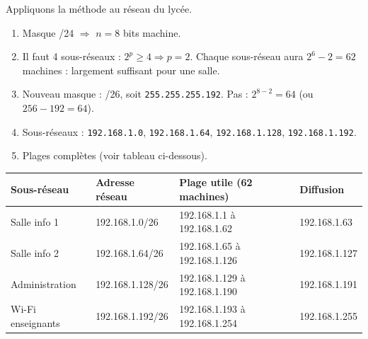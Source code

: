 \documentclass[11pt]{article}
\begin{document}
\begin{exemplebox}
Appliquons la méthode au réseau du lycée.
\begin{enumerate}
\item Masque /24 $\Rightarrow$ $n = 8$ bits machine.
\item Il faut 4 sous-réseaux : $2^p \geq 4 \Rightarrow p = 2$. Chaque sous-réseau aura $2^6 - 2 = 62$ machines : largement suffisant pour une salle.
\item Nouveau masque : /26, soit \texttt{255.255.255.192}. Pas : $2^{8-2} = 64$ (ou $256 - 192 = 64$).
\item Sous-réseaux : \texttt{192.168.1.0}, \texttt{192.168.1.64}, \texttt{192.168.1.128}, \texttt{192.168.1.192}.
\item Plages complètes (voir tableau ci-dessous).
\end{enumerate}
\begin{center}
\begin{tabularx}{\linewidth}{|l|l|X|l|}
\hline
\rowcolor{popblueL} \textbf{Sous-réseau} & \textbf{Adresse réseau} & \textbf{Plage utile (62 machines)} & \textbf{Diffusion} \\
\hline
Salle info 1 & 192.168.1.0/26 & 192.168.1.1 à 192.168.1.62 & 192.168.1.63 \\
\hline
Salle info 2 & 192.168.1.64/26 & 192.168.1.65 à 192.168.1.126 & 192.168.1.127 \\
\hline
Administration & 192.168.1.128/26 & 192.168.1.129 à 192.168.1.190 & 192.168.1.191 \\
\hline
Wi-Fi enseignants & 192.168.1.192/26 & 192.168.1.193 à 192.168.1.254 & 192.168.1.255 \\
\hline
\end{tabularx}
\end{center}
\end{exemplebox}
\end{document}
